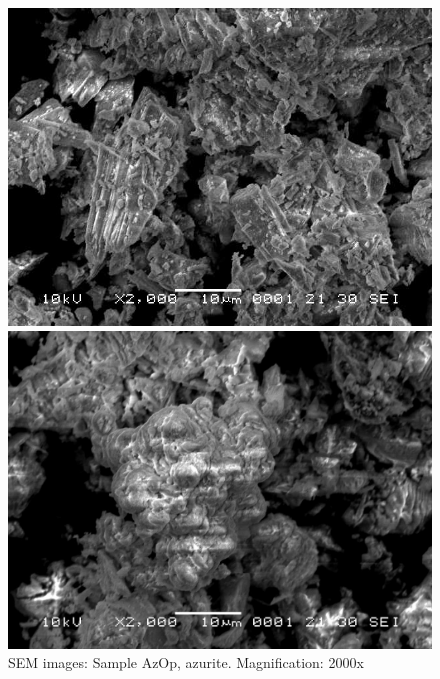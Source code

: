 \begin{figure}[H]
\centering
\begin{minipage}{.45\textwidth}
  \centering
  \includegraphics[width=\linewidth]{AzOp_x2000_1_150321}
\end{minipage}
\begin{minipage}{.45\textwidth}
  \centering
  \includegraphics[width=\linewidth]{AzOp_x2000_4_150321}
\end{minipage}
\caption[SEM images: Sample AzOp, azurite]{SEM images: Sample AzOp, azurite. Magnification: 2000x}
\label{fig:azop_sem_3}
\end{figure}


